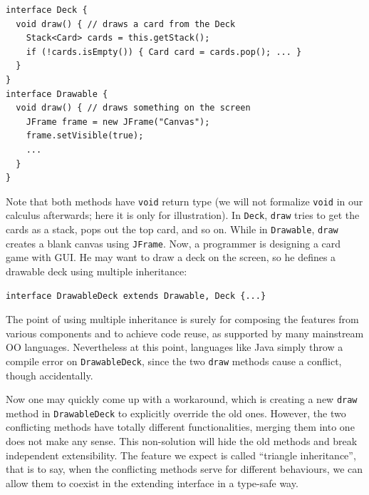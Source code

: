 \vspace{3pt}\begin{lstlisting}
interface Deck {
  void draw() { // draws a card from the Deck
    Stack<Card> cards = this.getStack();
    if (!cards.isEmpty()) { Card card = cards.pop(); ... }
  }
}
interface Drawable {
  void draw() { // draws something on the screen
    JFrame frame = new JFrame("Canvas");
    frame.setVisible(true);
    ...
  }
}
\end{lstlisting}\vspace{3pt}
Note that both methods have \lstinline|void| return type (we will not formalize
\lstinline|void| in our calculus afterwards; here it is only for illustration). 
In \lstinline|Deck|, \lstinline|draw| tries to get the cards as a stack, pops
out the top card, and so on. While in \lstinline|Drawable|, \lstinline|draw|
creates a blank canvas using \lstinline|JFrame|. Now, a programmer is designing a
card game with GUI. He may want to draw a deck on the screen, so he defines a drawable
deck using multiple inheritance:

\vspace{3pt}\begin{lstlisting}
interface DrawableDeck extends Drawable, Deck {...} 
\end{lstlisting}\vspace{3pt}
The point of using multiple inheritance is surely for composing the features from various 
components and to achieve code reuse, as supported by many mainstream OO
languages. Nevertheless at this point, languages like Java simply throw a compile
error on \lstinline|DrawableDeck|, since the two \lstinline|draw| methods cause a conflict, though accidentally.

Now one may quickly come up with a workaround, which is creating a new \lstinline|draw| method in \lstinline|DrawableDeck| to
explicitly override the old ones. However, the two conflicting methods have totally different functionalities, merging
them into one does not make any sense. This non-solution will hide the old methods and break independent extensibility. The
feature we expect is called ``triangle inheritance'', that is to say, when the conflicting methods serve for different behaviours,
we can allow them to coexist in the extending interface in a type-safe way.\\

